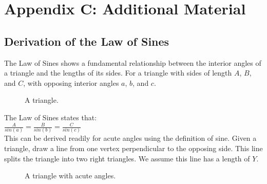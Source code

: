 \section{Appendix C:  Additional Material}

\subsection{Derivation of the Law of Sines}

The Law of Sines shows a fundamental relationship between the interior angles of a triangle and the lengths of its sides.  For a triangle with sides of length $A$, $B$, and $C$, with opposing interior angles $a$, $b$, and $c$.\\

\begin{figure}[htb]
\center
\caption{A triangle.}
\label{fig:A triangle}
\end{figure} 

The Law of Sines states that:\\


\tab$\frac{A}{sin(a)} = \frac{B}{sin(b)} = \frac{C}{sin(c)}$\\

This can be derived readily for acute angles using the definition of sine.  Given a triangle, draw a line from one vertex perpendicular to the opposing side.  This line splits the triangle into two right triangles.  We assume this line has a length of $Y$.\\

\begin{figure}[htb]
\center
\caption{A triangle with acute angles.}
\label{fig:A triangle}
\end{figure}

